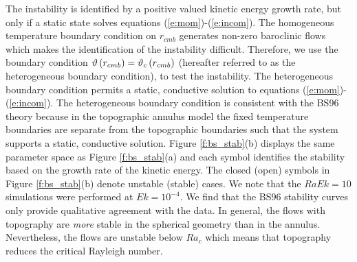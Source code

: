 The instability is identified by a positive valued kinetic energy growth rate, but only if a static state solves equations (\ref{e:mom})-(\ref{e:incom}). 
 The homogeneous temperature boundary condition on $r_{cmb}$ generates non-zero baroclinic flows which makes the identification of the instability difficult. Therefore, we use the boundary condition $\vartheta\left ( r_{cmb}\right ) = \vartheta_{c}\left ( r_{cmb}\right )$ (hereafter referred to as the heterogeneous boundary condition), to test the instability. The heterogeneous boundary condition permits a static, conductive solution to equations (\ref{e:mom})-(\ref{e:incom}).  The heterogeneous boundary condition is consistent with the BS96 theory because in the topographic annulus model the fixed temperature boundaries are separate from the topographic boundaries such that the system supports a static, conductive solution.
 Figure \ref{f:bs_stab}(b) displays the same parameter space as Figure \ref{f:bs_stab}(a) and each symbol identifies the stability based on the growth rate of the kinetic energy. 
 The closed (open) symbols in Figure \ref{f:bs_stab}(b) denote unstable (stable) cases. We note that the $RaEk = 10$ simulations were performed at $Ek = 10^{-4}.$ 
 We find that the BS96 stability curves only provide qualitative agreement with the data. 
 In general, the flows with topography are \textit{more} stable in the spherical geometry than in the annulus. 
 Nevertheless, the flows are unstable below $Ra_{c}$ which means that topography reduces the critical Rayleigh number.

